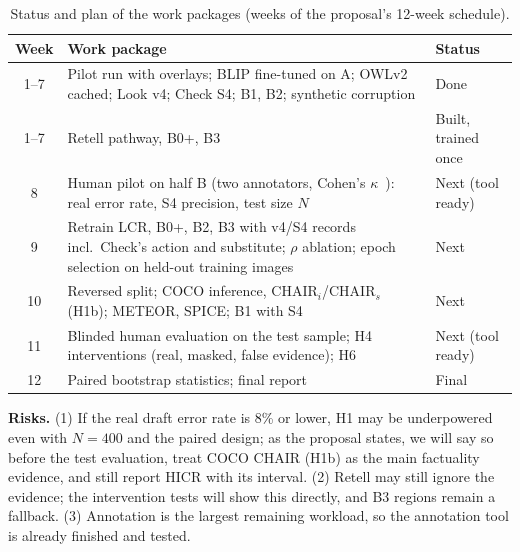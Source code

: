 \documentclass[conference]{IEEEtran}
\begin{document}
\begin{table}[t]
\caption{Status and plan of the work packages (weeks of the proposal's 12-week schedule).}
\label{tab:status}
\centering\footnotesize\setlength{\tabcolsep}{3pt}
\begin{tabular}{@{}c>{\raggedright\arraybackslash}p{5.4cm}>{\raggedright\arraybackslash}p{1.65cm}@{}}
\toprule
Week & Work package & Status \\
\midrule
1--7 & Pilot run with overlays; BLIP fine-tuned on A; OWLv2 cached; Look v4; Check S4; B1, B2; synthetic
corruption & Done \\
1--7 & Retell pathway, B0+, B3 & Built, trained once \\
8 & Human pilot on half B (two annotators, Cohen's $\kappa$~\cite{cohen1960coefficient}): real error rate,
S4 precision, test size $N$ & Next (tool ready) \\
9 & Retrain LCR, B0+, B2, B3 with v4/S4 records incl.\ Check's action and substitute; $\rho$ ablation; epoch
selection on held-out training images & Next \\
10 & Reversed split; COCO inference, CHAIR$_i$/CHAIR$_s$ (H1b); METEOR, SPICE; B1 with S4 & Next \\
11 & Blinded human evaluation on the test sample; H4 interventions (real, masked, false evidence); H6 & Next
(tool ready) \\
12 & Paired bootstrap statistics; final report & Final \\
\bottomrule
\end{tabular}
\end{table}

\textbf{Risks.} (1) If the real draft error rate is 8\% or lower, H1 may be underpowered even with $N=400$ and
the paired design; as the proposal states, we will say so before the test evaluation, treat COCO CHAIR (H1b)
as the main factuality evidence, and still report HICR with its interval. (2) Retell may still ignore the
evidence; the intervention tests will show this directly, and B3 regions remain a fallback. (3) Annotation is
the largest remaining workload, so the annotation tool is already finished and tested.



\end{document}
